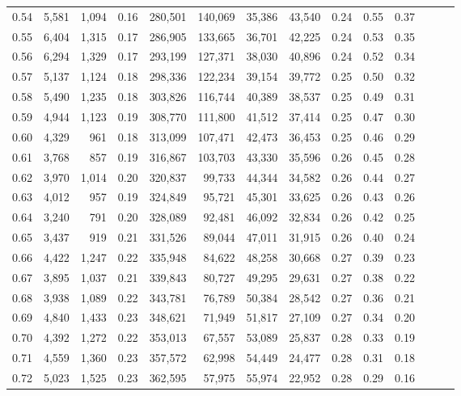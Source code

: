 \begin{tabular}{rrrrrrrrrrrrrr}
0.54 &  5,581 &  1,094 &  0.16 &  280,501 &  140,069 &  35,386 &  43,540 &  0.24 &  0.55 &      0.37 \\
0.55 &  6,404 &  1,315 &  0.17 &  286,905 &  133,665 &  36,701 &  42,225 &  0.24 &  0.53 &      0.35 \\
0.56 &  6,294 &  1,329 &  0.17 &  293,199 &  127,371 &  38,030 &  40,896 &  0.24 &  0.52 &      0.34 \\
0.57 &  5,137 &  1,124 &  0.18 &  298,336 &  122,234 &  39,154 &  39,772 &  0.25 &  0.50 &      0.32 \\
0.58 &  5,490 &  1,235 &  0.18 &  303,826 &  116,744 &  40,389 &  38,537 &  0.25 &  0.49 &      0.31 \\
0.59 &  4,944 &  1,123 &  0.19 &  308,770 &  111,800 &  41,512 &  37,414 &  0.25 &  0.47 &      0.30 \\
0.60 &  4,329 &    961 &  0.18 &  313,099 &  107,471 &  42,473 &  36,453 &  0.25 &  0.46 &      0.29 \\
0.61 &  3,768 &    857 &  0.19 &  316,867 &  103,703 &  43,330 &  35,596 &  0.26 &  0.45 &      0.28 \\
0.62 &  3,970 &  1,014 &  0.20 &  320,837 &   99,733 &  44,344 &  34,582 &  0.26 &  0.44 &      0.27 \\
0.63 &  4,012 &    957 &  0.19 &  324,849 &   95,721 &  45,301 &  33,625 &  0.26 &  0.43 &      0.26 \\
0.64 &  3,240 &    791 &  0.20 &  328,089 &   92,481 &  46,092 &  32,834 &  0.26 &  0.42 &      0.25 \\
0.65 &  3,437 &    919 &  0.21 &  331,526 &   89,044 &  47,011 &  31,915 &  0.26 &  0.40 &      0.24 \\
0.66 &  4,422 &  1,247 &  0.22 &  335,948 &   84,622 &  48,258 &  30,668 &  0.27 &  0.39 &      0.23 \\
0.67 &  3,895 &  1,037 &  0.21 &  339,843 &   80,727 &  49,295 &  29,631 &  0.27 &  0.38 &      0.22 \\
0.68 &  3,938 &  1,089 &  0.22 &  343,781 &   76,789 &  50,384 &  28,542 &  0.27 &  0.36 &      0.21 \\
0.69 &  4,840 &  1,433 &  0.23 &  348,621 &   71,949 &  51,817 &  27,109 &  0.27 &  0.34 &      0.20 \\
0.70 &  4,392 &  1,272 &  0.22 &  353,013 &   67,557 &  53,089 &  25,837 &  0.28 &  0.33 &      0.19 \\
0.71 &  4,559 &  1,360 &  0.23 &  357,572 &   62,998 &  54,449 &  24,477 &  0.28 &  0.31 &      0.18 \\
0.72 &  5,023 &  1,525 &  0.23 &  362,595 &   57,975 &  55,974 &  22,952 &  0.28 &  0.29 &      0.16 \\

\end{tabular}
